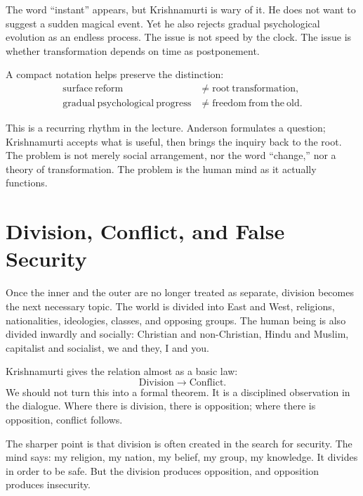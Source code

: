 The word ``instant'' appears, but Krishnamurti is wary of it. He does not want to suggest a sudden magical event. Yet he also rejects gradual psychological evolution as an endless process. The issue is not speed by the clock. The issue is whether transformation depends on time as postponement.

A compact notation helps preserve the distinction:
\begin{align}
\mathrm{surface\ reform}
&\ne
\mathrm{root\ transformation},\\
\mathrm{gradual\ psychological\ progress}
&\ne
\mathrm{freedom\ from\ the\ old}.
\end{align}

This is a recurring rhythm in the lecture. Anderson formulates a question; Krishnamurti accepts what is useful, then brings the inquiry back to the root. The problem is not merely social arrangement, nor the word ``change,'' nor a theory of transformation. The problem is the human mind as it actually functions.

\section{Division, Conflict, and False Security}

Once the inner and the outer are no longer treated as separate, division becomes the next necessary topic. The world is divided into East and West, religions, nationalities, ideologies, classes, and opposing groups. The human being is also divided inwardly and socially: Christian and non-Christian, Hindu and Muslim, capitalist and socialist, we and they, I and you.

Krishnamurti gives the relation almost as a basic law:
\begin{equation}
\mathrm{Division}
\longrightarrow
\mathrm{Conflict}.
\end{equation}
We should not turn this into a formal theorem. It is a disciplined observation in the dialogue. Where there is division, there is opposition; where there is opposition, conflict follows.

The sharper point is that division is often created in the search for security. The mind says: my religion, my nation, my belief, my group, my knowledge. It divides in order to be safe. But the division produces opposition, and opposition produces insecurity.


